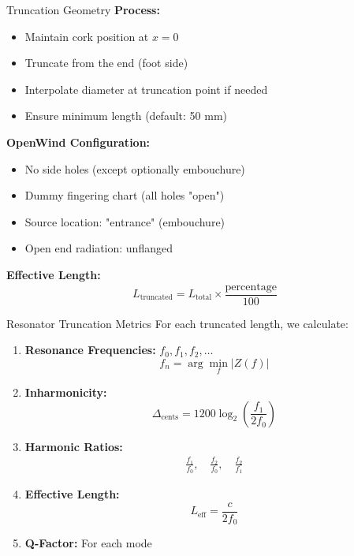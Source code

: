 \documentclass[aspectratio=169,10pt]{beamer}
\begin{document}
\begin{frame}{Truncation Geometry}
\textbf{Process:}
\begin{itemize}
    \item Maintain cork position at $x = 0$
    \item Truncate from the end (foot side)
    \item Interpolate diameter at truncation point if needed
    \item Ensure minimum length (default: 50 mm)
\end{itemize}

\textbf{OpenWind Configuration:}
\begin{itemize}
    \item No side holes (except optionally embouchure)
    \item Dummy fingering chart (all holes "open")
    \item Source location: "entrance" (embouchure)
    \item Open end radiation: unflanged
\end{itemize}

\textbf{Effective Length:}
\begin{equation*}
L_{\text{truncated}} = L_{\text{total}} \times \frac{\text{percentage}}{100}
\end{equation*}
\end{frame}

\begin{frame}{Resonator Truncation Metrics}
For each truncated length, we calculate:

\begin{enumerate}
    \item \textbf{Resonance Frequencies:} $f_0, f_1, f_2, \ldots$
    \begin{equation*}
    f_n = \arg\min_f |Z(f)|
    \end{equation*}
    
    \item \textbf{Inharmonicity:}
    \begin{equation*}
    \Delta_{\text{cents}} = 1200 \log_2\left(\frac{f_1}{2f_0}\right)
    \end{equation*}
    
    \item \textbf{Harmonic Ratios:}
    \begin{align*}
    \frac{f_1}{f_0}, \quad \frac{f_2}{f_0}, \quad \frac{f_2}{f_1}
    \end{align*}
    
    \item \textbf{Effective Length:}
    \begin{equation*}
    L_{\text{eff}} = \frac{c}{2f_0}
    \end{equation*}
    
    \item \textbf{Q-Factor:} For each mode
\end{enumerate}
\end{frame}
\end{document}
